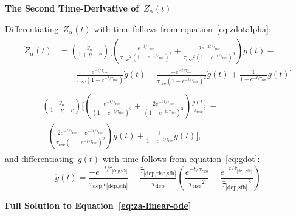 \documentclass[12pt]{article}
\newcommand{\timescale}[1]{\ensuremath{\tau_\text{#1}}}
\newcommand{\harmonic}[2]{\ensuremath{\bar{\tau}_\text{[#1,#2]}}}
\newcommand{\hharmonic}[3]{\ensuremath{\bar{\tau}_\text{[#1,#2,#3]}}}
\begin{document}
\par\null\par\noindent
\textbf{The Second Time-Derivative of~$Z_\alpha(t)$}
\par\noindent
Differentiating~$\dot{Z}_\alpha(t)$ with time follows from
equation~\ref{eq:zdotalpha}:
\begin{subequations}\begin{align}
\begin{split}
\ddot{Z}_\alpha(t) &= \left(\frac{y_\alpha}{1 + \eta - r}\right)\Bigg[
\left(\frac{
	e^{-t / \timescale{rise}}
}{
	\timescale{rise}^2 \left(1 - e^{-t / \timescale{rise}}\right)^2
} + \frac{
	2e^{-2t / \timescale{rise}}
}{
	\timescale{rise}^2 \left(1 - e^{-t / \timescale{rise}}\right)^3
}\right)g(t) -
\\
&\qquad \frac{
	e^{-t / \timescale{rise}}
}{
	\timescale{rise} \left(1 - e^{-t / \timescale{rise}}\right)
} \dot{g}(t) + \frac{
	-e^{-t / \timescale{rise}}
}{
	\timescale{rise} \left(1 - e^{-t / \timescale{rise}}\right)^2
} \dot{g}(t) + \frac{1}{1 - e^{-t / \timescale{rise}}} \ddot{g}(t) \Bigg]
\end{split}
\\
\begin{split}
&= \left(\frac{y_\alpha}{1 + \eta - r}\right) \Bigg[
\left(\frac{
	e^{-t / \timescale{rise}}
}{
	\left(1 - e^{-t / \timescale{rise}}\right)^2
} + \frac{
	2e^{-2t / \timescale{rise}}
}{
	\left(1 - e^{-t / \timescale{rise}}\right)^3
}\right) \frac{g(t)}{\timescale{rise}^2} -
\\
&\qquad \left(\frac{
	2e^{-t / \timescale{rise}} + e^{-2t / \timescale{rise}}
}{
	\timescale{rise} \left(1 - e^{-t / \timescale{rise}}\right)^2
}\right) \dot{g}(t) + \frac{1}{1 - e^{-t / \timescale{rise}}} \ddot{g}(t)
\Bigg],
\end{split}
\end{align}\end{subequations}
and differentiating~$\dot{g}(t)$ with time follows from
equation~\ref{eq:gdot}:
\begin{equation}
\ddot{g}(t) = \frac{
	-e^{-t / \harmonic{dep}{sfh}}
}{
	\timescale{dep}\harmonic{dep}{sfh}
} - \frac{\hharmonic{dep}{rise}{sfh}}{\timescale{dep}}\left(\frac{
	e^{-t / \timescale{rise}}
}{
	\timescale{rise}^2
} - \frac{
	e^{-t / \harmonic{dep}{sfh}}
}{
	\harmonic{dep}{sfh}^2
}\right)
\end{equation}

\newpage



\newpage
\noindent
\textbf{Full Solution to Equation~\ref{eq:za-linear-ode}}
\end{document}
